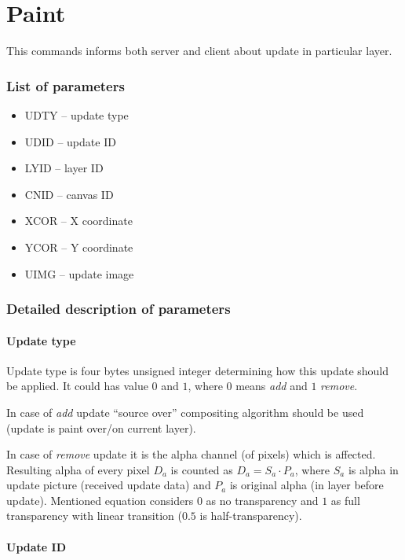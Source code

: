\chapter{Paint}

This commands informs both server and client about update in particular layer.

\subsection{List of parameters}

\begin{itemize}
	\item UDTY -- update type
	\item UDID -- update ID
	\item LYID -- layer ID
	\item CNID -- canvas ID
	\item XCOR -- X coordinate
	\item YCOR -- Y coordinate
	\item UIMG -- update image				
\end{itemize}

\subsection{Detailed description of parameters}

\subsubsection{Update type}

Update type is four bytes unsigned integer determining how this update should be applied. It could has value $0$ and $1$, where $0$ means \emph{add} and $1$ \emph{remove}.

In case of \emph{add} update ``source over'' compositing algorithm should be used (update is paint over/on current layer).

In case of \emph{remove} update it is the alpha channel (of pixels) which is affected. Resulting alpha of every pixel $D_{a}$ is counted as $D_{a} = S_{a} \cdot P_{a}$, where $S_{a}$ is alpha in update picture (received update data) and $P_{a}$ is original alpha (in layer before update). Mentioned equation considers $0$ as no transparency and $1$ as full transparency with linear transition ($0.5$ is half-transparency). 

\subsubsection{Update ID}

